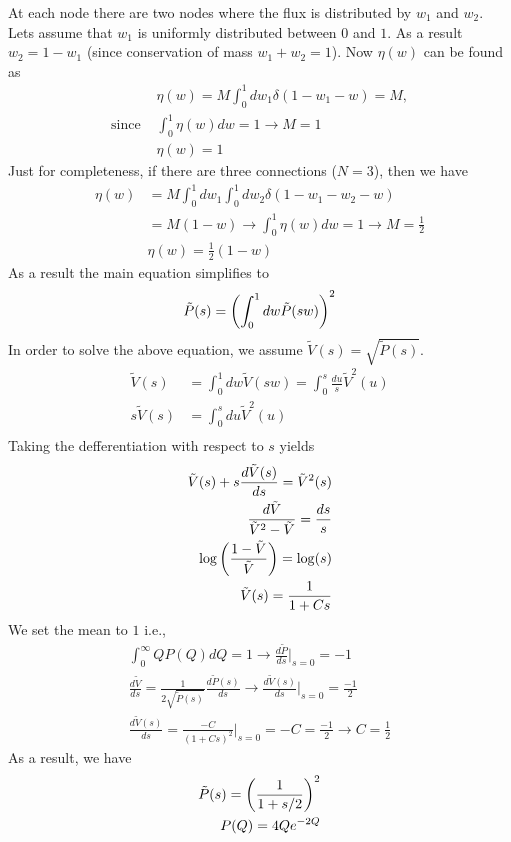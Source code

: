 At each node there are two nodes where the flux is distributed by
$w_1$ and $w_2$. Lets assume that $w_1$ is uniformly distributed
between $0$ and $1$. As a result $w_2 = 1-w_1$ (since conservation of
mass $w_1 + w_2 = 1$). Now $\eta(w)$ can be found as
%
\begin{align}
  & \eta(w) = M \int_0^1 dw_1 \delta(1-w_1-w) =  M, \\
  \text{since }& \int_0^1 \eta(w) dw = 1 \to M =1 \\
  & \eta (w) = 1
\end{align}
%
Just for completeness, if there are three connections ($N=3$), then we
have
%
\begin{align}
  \eta(w) & = M \int_0^1 dw_1 \int_0^1 dw_2 \delta(1-w_1-w_2 - w)\\
          & = M(1-w)  \to \int_0^1\eta(w) dw = 1 \to M = \frac{1}{2} \\
  & \eta(w) = \frac{1}{2} (1-w)
\end{align}
%
As a result the main equation simplifies to
%
\begin{align}
  \tilde P(s) = \left(  \int_0^1 d w  \tilde P(s w)  \right)^{2} 
\end{align}
%
In order to solve the above equation, we assume $\tilde V (s) =
\sqrt{\tilde{P}(s)}$.
%
\begin{align}
  \tilde{V}(s) & = \int_0^1 dw \tilde V (sw) = \int_0^s \frac{du}{s}  \tilde{V}^{2}(u) \\
  s\tilde{V}(s) & = \int_0^s du  \tilde{V}^2(u) \\
\end{align}
%
Taking the defferentiation with respect to $s$ yields
%
\begin{align}
  \tilde{V}(s) + s \frac{d \tilde{V}(s)}{d s} = \tilde{V}^2(s) \\
  \frac{d \tilde{V}}{\tilde{V}^2-\tilde{V}} = \frac{ds}{s}  \\
  \log\left( \frac{1-\tilde{V}}{\tilde{V}} \right)  = \log(s)\\
  \tilde{V}(s) = \frac{1}{1+Cs} 
\end{align}
%
We set the mean to $1$ i.e.,
%
\begin{align}
  \int_0^{\infty} Q P(Q) dQ = 1 \to \frac{d\tilde{P}}{ds}|_{s=0}  = -1\\
  \frac{d \tilde{V}}{ds}  = \frac{1}{2 \sqrt{\tilde{P}(s)}} \frac{d \tilde{P}(s)}{d s}   \to \frac{d\tilde{V}(s)}{ds}|_{s=0} =\frac{-1}{2} \\
  \frac{d\tilde{V}(s)}{ds} = \frac{-C}{(1+Cs)^{2}}|_{s=0} = -C = \frac{-1}{2}  \to C=\frac{1}{2} 
\end{align}
%
As a result, we have
%
\begin{align}
  \tilde{P}(s) = \left(\frac{1}{1+s/2} \right)^2 \\
  P(Q) = 4Q e^{-2Q}
\end{align}



